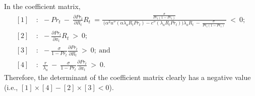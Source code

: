 In the coefficient matrix,
\begin{equation*}
\begin{split}
    [1] \ 
    & : \ \ -Pr_{t} \ - \ \frac{\partial Pr_{t}}{\partial R_{t}} R_{t} \ = \frac{\frac{\sigma}{Pr_{t}(1 - Pr_{t})}}{ \ \big( \alpha^{2} u''(\alpha \lambda_{a} R_{t} Pr_{t}) - c''(\lambda_{a} R_{t} Pr_{t}) \big) \lambda_{a} R_{t} \ - \ \frac{\sigma}{Pr_{t}(1 - Pr_{t})} \ } \ < \ 0; \\
    [2] \
    & : \ \ -\frac{\partial Pr_{t}}{\partial \pi_{t}} R_{t} \ > \ 0; \\
    [3] \
    & : \ \ -\frac{\sigma}{1 - Pr_{t}} \frac{\partial Pr_{t}}{\partial R_{t}} \ > \ 0; \ \text{and} \\
    [4] \ 
    & : \ \ \frac{r}{\lambda_{a}} \ - \ \frac{\sigma}{1 - Pr_{t}} \frac{\partial Pr_{t}}{\partial \pi_{t}} \ > \ 0.
\end{split}
\end{equation*}
Therefore, the determinant of the coefficient matrix clearly has a negative value (i.e., $[1] \times [4] - [2] \times [3] < 0$). 